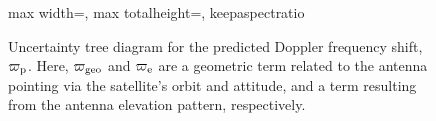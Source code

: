 \begin{figure}[p]
\begin{adjustbox}{max width=\textwidth, max totalheight=\textheight, keepaspectratio}
  \end{adjustbox}

  \caption{Uncertainty tree diagram for the predicted Doppler frequency shift,
  $\varpi_{\rm p}$. Here, $\varpi_{\rm geo}$ and $\varpi_{\rm e}$ are a
  geometric term related to the antenna pointing via the satellite’s orbit and
  attitude, and a term resulting from the antenna elevation pattern,
  respectively.}

  \label{fig:utd_varpi_p}
\end{figure}
